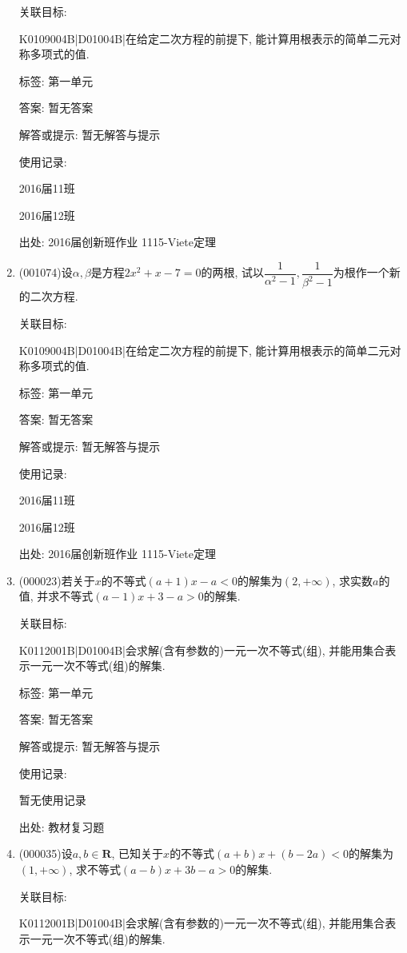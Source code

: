 \documentclass[10pt,a4paper]{article}
\begin{document}
\begin{enumerate}[1.]
关联目标:

K0109004B|D01004B|在给定二次方程的前提下, 能计算用根表示的简单二元对称多项式的值.



标签: 第一单元

答案: 暂无答案

解答或提示: 暂无解答与提示

使用记录:

2016届11班	

2016届12班	


出处: 2016届创新班作业	1115-Viete定理
\item { (001074)}设$\alpha,\beta$是方程$2x^2+x-7=0$的两根, 试以$\dfrac{1}{\alpha^2-1},\dfrac{1}{\beta^2-1}$为根作一个新的二次方程.


关联目标:

K0109004B|D01004B|在给定二次方程的前提下, 能计算用根表示的简单二元对称多项式的值.



标签: 第一单元

答案: 暂无答案

解答或提示: 暂无解答与提示

使用记录:

2016届11班	

2016届12班	


出处: 2016届创新班作业	1115-Viete定理
\item { (000023)}若关于$x$的不等式$(a+1)x-a<0$的解集为$(2,+\infty)$, 求实数$a$的值, 并求不等式$(a-1)x+3-a>0$的解集.


关联目标:

K0112001B|D01004B|会求解(含有参数的)一元一次不等式(组), 并能用集合表示一元一次不等式(组)的解集.



标签: 第一单元

答案: 暂无答案

解答或提示: 暂无解答与提示

使用记录:

暂无使用记录


出处: 教材复习题
\item { (000035)}设$a,b\in \mathbf{R}$, 已知关于$x$的不等式$(a+b)x+(b-2a)<0$的解集为$(1, +\infty)$, 求不等式$(a-b)x+3b-a>0$的解集.


关联目标:

K0112001B|D01004B|会求解(含有参数的)一元一次不等式(组), 并能用集合表示一元一次不等式(组)的解集.




\end{enumerate}
\end{document}
